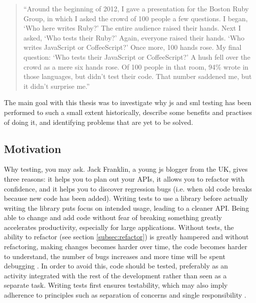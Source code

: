 \documentclass[11pt]{article}
\begin{document}
\begin{quote}
``Around the beginning of 2012, I gave a presentation for the Boston Ruby Group, in which I asked the crowd of 100 people a few questions. I began, `Who here writes Ruby?' The entire audience raised their hands. Next I asked, `Who tests their Ruby?' Again, everyone raised their hands. `Who writes JavaScript or CoffeeScript?' Once more, 100 hands rose. My final question: `Who tests their JavaScript or CoffeeScript?' A hush fell over the crowd as a mere six hands rose. Of 100 people in that room, 94\% wrote in those languages, but didn't test their code. That number saddened me, but it didn't surprise me.''
\end{quote}

\begin{center}
\end{center}

The main goal with this thesis was to investigate why \gls{js} and \gls{sml} testing has been performed to such a small extent historically, describe some benefits and practises of doing it, and identifying problems that are yet to be solved.

\subsection{Motivation}
\label{subsec:motivation}

Why testing, you may ask. Jack Franklin, a young \gls{js} blogger from the UK, gives three reasons: it helps you to plan out your APIs, it allows you to refactor with confidence, and it helps you to discover regression bugs (i.e. when old code breaks because new code has been added). Writing tests to use a library before actually writing the library puts focus on intended usage, leading to a cleaner API. Being able to change and add code without fear of breaking something greatly accelerates productivity, especially for large applications. \cite{JackFranklin} Without tests, the ability to refactor (see section \ref{subsec:refactor}) is greatly hampered and without refactoring, making changes becomes harder over time, the code becomes harder to understand, the number of bugs increases and more time will be spent debugging \cite[p.~47-49]{Refactoring}. In order to avoid this, code should be tested, preferably as an activity integrated with the rest of the development rather than seen as a separate task. Writing tests first ensures testability, which may also imply adherence to principles such as separation of concerns and single responsibility \cite[p.~35-37]{Clean}.
\end{document}
